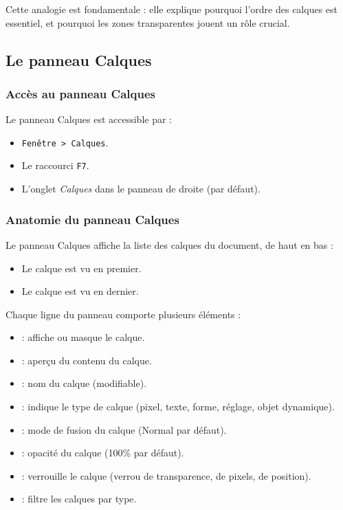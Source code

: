 Cette analogie est fondamentale : elle explique pourquoi l'ordre des calques est essentiel, et pourquoi les zones transparentes jouent un rôle crucial.

\subsection{Le panneau Calques}

\subsubsection{Accès au panneau Calques}

Le panneau Calques est accessible par :

\begin{itemize}
    \item \texttt{Fenêtre > Calques}.
    \item Le raccourci \texttt{F7}.
    \item L'onglet \emph{Calques} dans le panneau de droite (par défaut).
\end{itemize}

\subsubsection{Anatomie du panneau Calques}

Le panneau Calques affiche la liste des calques du document, de haut en bas :

\begin{itemize}
    \item Le calque  est vu en premier.
    \item Le calque  est vu en dernier.
\end{itemize}

Chaque ligne du panneau comporte plusieurs éléments :

\begin{itemize}
    \item {} : affiche ou masque le calque.
    \item {} : aperçu du contenu du calque.
    \item {} : nom du calque (modifiable).
    \item {} : indique le type de calque (pixel, texte, forme, réglage, objet dynamique).
    \item {} : mode de fusion du calque (Normal par défaut).
    \item {} : opacité du calque (100\% par défaut).
    \item {} : verrouille le calque (verrou de transparence, de pixels, de position).
    \item {} : filtre les calques par type.
\end{itemize}

